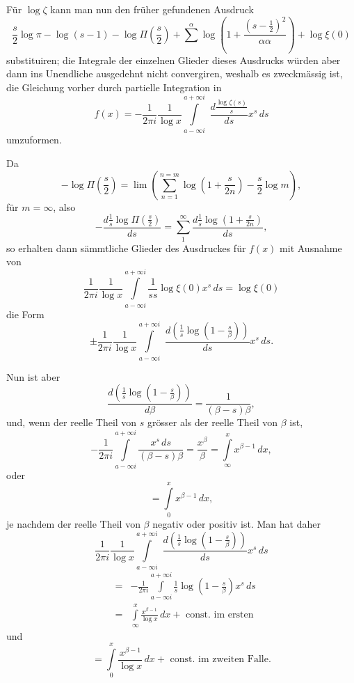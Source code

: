 \documentclass[a4paper,12pt]{article}
\begin{document}
F\"{u}r $\log \zeta$ kann man nun den fr\"{u}her gefundenen Ausdruck
\[ \frac{s}{2} \log \pi - \log (s - 1)
   - \log \Pi \left( \frac{s}{2} \right)
   + {\textstyle\sum}^\alpha \log \left(
         1 + \frac{(s - \frac{1}{2})^2}{\alpha\alpha} \right)
   + \log \xi(0) \]
substituiren; die Integrale der einzelnen Glieder dieses Ausdrucks
w\"{u}rden aber dann ins Unendliche ausgedehnt nicht convergiren,
weshalb es zweckm\"{a}ssig ist, die Gleichung vorher durch partielle
Integration in
\[ f(x) = - \frac{1}{2\pi i} \frac{1}{\log x}
         \int\limits_{a - \infty i}^{a + \infty i} \, \,
         \frac{\displaystyle d \frac{\log \zeta(s)}{s}}{ds}
         x^s \,ds \]
umzuformen.

Da
\[ - \log \Pi \left( \frac{s}{2} \right)
   = \lim \left( \sum_{n=1}^{n = m}
         \log \left( 1 + \frac{s}{2n} \right)
         - \frac{s}{2} \log m \right),\]
f\"{u}r $m = \infty$, also
\[ - \frac{\displaystyle d \frac{1}{s}
            \log \Pi \left( \frac{s}{2} \right)}{ds}
   = \sum_1^\infty \frac{\displaystyle d \frac{1}{s}
            \log \left( 1 + \frac{s}{2n} \right)}{ds},\]
so erhalten dann s\"{a}mmtliche Glieder des Ausdruckes f\"{u}r $f(x)$
mit Ausnahme von
\[ \frac{1}{2\pi i} \frac{1}{\log x}
         \int\limits_{a - \infty i}^{a + \infty i}
         \frac{1}{ss} \log \xi(0) x^s \,ds
   = \log \xi(0) \]
die Form
\[ \pm \frac{1}{2\pi i} \frac{1}{\log x}
         \int\limits_{a - \infty i}^{a + \infty i} \, \,
         \frac{\displaystyle d \left( \frac{1}{s} \log \left(
               1 - \frac{s}{\beta} \right) \right)}{ds}
         x^s \,ds.\]

Nun ist aber
\[ \frac{\displaystyle d \left( \frac{1}{s} \log \left(
               1 - \frac{s}{\beta} \right) \right)}{d\beta}
   = \frac{1}{(\beta - s)\beta},\]
und, wenn der reelle Theil von $s$ gr\"{o}sser als der reelle Theil von
$\beta$ ist,
\[ - \frac{1}{2\pi i} \int\limits_{a - \infty i}^{a + \infty i}
         \frac{x^s \,ds}{(\beta - s)\beta}
   = \frac{x^\beta}{\beta} = \int\limits_\infty^x x^{\beta - 1} \,dx,\]
oder
\[ = \int\limits_0^x x^{\beta - 1} \,dx,\]
je nachdem der reelle Theil von $\beta$ negativ oder positiv ist.
Man hat daher
\[ \frac{1}{2\pi i} \frac{1}{\log x}
         \int\limits_{a - \infty i}^{a + \infty i} \, \,
         \frac{\displaystyle d \left( \frac{1}{s} \log \left(
               1 - \frac{s}{\beta} \right) \right)}{ds}
         x^s \,ds \]
\begin{eqnarray*}
   &=& - \frac{1}{2\pi i} \int\limits_{a - \infty i}^{a + \infty i}
         \frac{1}{s} \log \left( 1 - \frac{s}{\beta} \right)
         x^s \,ds \\
   &=& \int\limits_\infty^x \frac{x^{\beta - 1}}{\log x} \,dx
     + \mbox{ const.\ im ersten}
\end{eqnarray*}
und
\[
   =   \int\limits_0^x \frac{x^{\beta - 1}}{\log x} \,dx
     + \mbox{ const.\ im zweiten Falle.} \]
\end{document}

